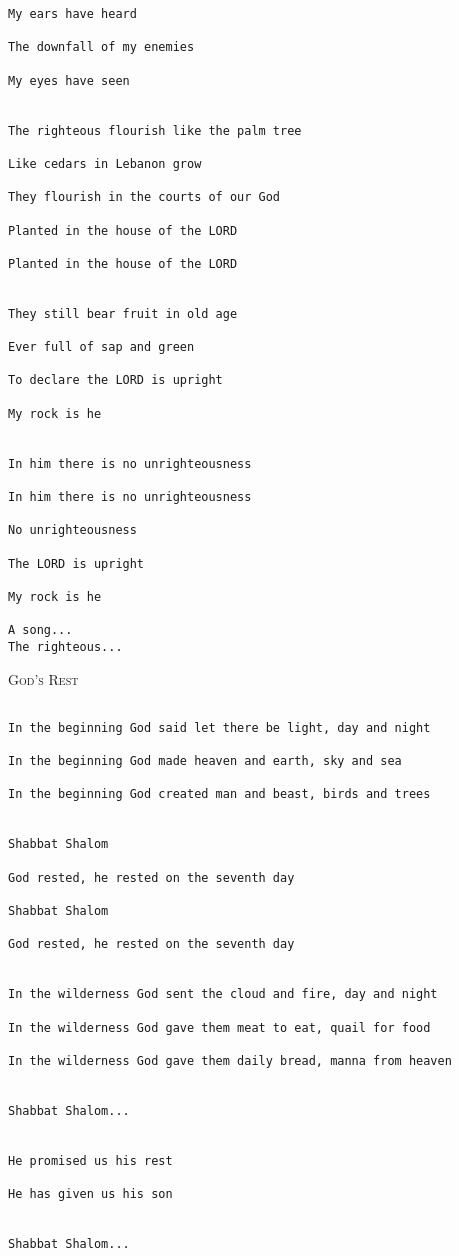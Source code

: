\documentclass[10pt,oneside,footinclude=true,headinclude=true]{scrbook} %
\newcommand\songtitle[1]{
	\hspace*{-3.7mm}\Large\textsc{#1}
}
\begin{document}
\begin{verbatim}
My ears have heard

The downfall of my enemies

My eyes have seen


The righteous flourish like the palm tree

Like cedars in Lebanon grow

They flourish in the courts of our God

Planted in the house of the LORD

Planted in the house of the LORD


They still bear fruit in old age

Ever full of sap and green

To declare the LORD is upright

My rock is he


In him there is no unrighteousness

In him there is no unrighteousness

No unrighteousness

The LORD is upright

My rock is he

A song...
The righteous...
\end{verbatim}

\songtitle{God's Rest}

\begin{verbatim}

In the beginning God said let there be light, day and night

In the beginning God made heaven and earth, sky and sea

In the beginning God created man and beast, birds and trees


Shabbat Shalom

God rested, he rested on the seventh day

Shabbat Shalom

God rested, he rested on the seventh day


In the wilderness God sent the cloud and fire, day and night

In the wilderness God gave them meat to eat, quail for food

In the wilderness God gave them daily bread, manna from heaven


Shabbat Shalom...


He promised us his rest

He has given us his son


Shabbat Shalom...
\end{verbatim}
\end{document}
